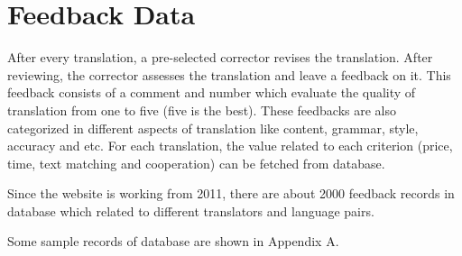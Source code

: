 \section{Feedback Data}
After every translation, a pre-selected corrector revises the translation. After reviewing, the corrector assesses the translation and leave a feedback on it. This feedback consists of a comment and number which evaluate the quality of translation from one to five (five is the best). These feedbacks are also categorized in different aspects of translation like content, grammar, style, accuracy and etc. For each translation, the value related to each criterion (price, time, text matching and cooperation) can be fetched from database.

Since the website is working from 2011, there are about 2000 feedback records in database which related to different translators and language pairs.

Some sample records of database are shown in Appendix A.